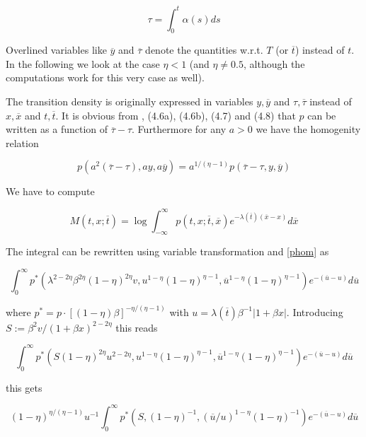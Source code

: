 \documentclass{amsart}
\theoremstyle{plain}
\numberwithin{equation}{section}
\begin{document}
\begin{equation}
\tau = \int_0^{t} \alpha(s) ds
\end{equation}

Overlined variables like $\overline{y}$ and $\overline{\tau}$ denote the quantities w.r.t. $T$ (or $\overline{t}$) instead of $t$. In the following we look at the case $\eta < 1$ (and $\eta \neq 0.5$, although the computations work for this very case as well).

The transition density is originally expressed in variables $y, \overline{y}$ and $\tau, \overline{\tau}$ instead of $x, \overline{x}$ and $t, \overline{t}$. It is obvious from \cite{betaeta}, (4.6a), (4.6b), (4.7) and (4.8) that $p$ can be written as a function of $\overline{\tau}-\tau$. Furthermore for any $a > 0$ we have the homogenity relation

\begin{equation}\label{phom}
p\left(a^2(\overline{\tau}-\tau), ay, a\overline{y}\right) = a^{1/(\eta-1)} p\left(\overline{\tau}-\tau, y, \overline{y}\right)
\end{equation}

We have to compute

\begin{equation}
M(t,x;\overline{t}) = \log \int_{-\infty}^{\infty} p(t,x;\overline{t},\overline{x}) e^{-\lambda(\overline{t})(\overline{x}-x)}d\overline{x}
\end{equation}

The integral can be rewritten using variable transformation and \ref{phom} as

\begin{equation}
\int_{0}^{\infty} p^* ( \lambda^{2-2\eta} \beta^{2\eta} (1-\eta)^{2\eta} v, u^{1-\eta}(1-\eta)^{\eta-1}, \overline{u}^{1-\eta}(1-\eta)^{\eta-1} ) e^{-(\overline{u}-u)} d\overline{u}
\end{equation}

where $p^*= p\cdot [(1-\eta)\beta]^{-\eta/(\eta-1)}$ with $u = \lambda(\overline{t})\beta^{-1}|1+\beta x|$. Introducing $S:=\beta^2v/(1+\beta x)^{2-2\eta}$ this reads

\begin{equation}
\int_{0}^{\infty} p^* ( S (1-\eta)^{2\eta} u^{2-2\eta}, u^{1-\eta}(1-\eta)^{\eta-1}, \overline{u}^{1-\eta}(1-\eta)^{\eta-1} ) e^{-(\overline{u}-u)} d\overline{u}
\end{equation}

this gets

\begin{equation}
(1-\eta)^{\eta/(\eta-1)} u^{-1} \int_{0}^{\infty} p^* ( S, (1-\eta)^{-1}, (\overline{u}/u)^{1-\eta}(1-\eta)^{-1} ) e^{-(\overline{u}-u)} d\overline{u}
\end{equation}
\end{document}
